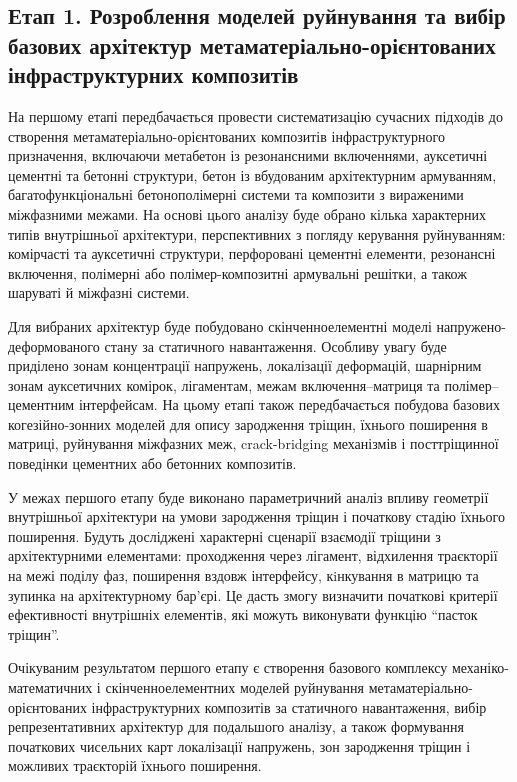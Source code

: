\documentclass[12pt,a4paper]{article}
\begin{document}
\subsection*{Етап 1. Розроблення моделей руйнування та вибір базових архітектур метаматеріально-орієнтованих інфраструктурних композитів}

На першому етапі передбачається провести систематизацію сучасних підходів до створення метаматеріально-орієнтованих композитів інфраструктурного призначення, включаючи метабетон із резонансними включеннями, ауксетичні цементні та бетонні структури, бетон із вбудованим архітектурним армуванням, багатофункціональні бетонополімерні системи та композити з вираженими міжфазними межами. На основі цього аналізу буде обрано кілька характерних типів внутрішньої архітектури, перспективних з погляду керування руйнуванням: комірчасті та ауксетичні структури, перфоровані цементні елементи, резонансні включення, полімерні або полімер-композитні армувальні решітки, а також шаруваті й міжфазні системи.

Для вибраних архітектур буде побудовано скінченноелементні моделі напружено-деформованого стану за статичного навантаження. Особливу увагу буде приділено зонам концентрації напружень, локалізації деформацій, шарнірним зонам ауксетичних комірок, лігаментам, межам включення--матриця та полімер--цементним інтерфейсам. На цьому етапі також передбачається побудова базових когезійно-зонних моделей для опису зародження тріщин, їхнього поширення в матриці, руйнування міжфазних меж, crack-bridging механізмів і посттріщинної поведінки цементних або бетонних композитів.

У межах першого етапу буде виконано параметричний аналіз впливу геометрії внутрішньої архітектури на умови зародження тріщин і початкову стадію їхнього поширення. Будуть досліджені характерні сценарії взаємодії тріщини з архітектурними елементами: проходження через лігамент, відхилення траєкторії на межі поділу фаз, поширення вздовж інтерфейсу, кiнкування в матрицю та зупинка на архітектурному бар'єрі. Це дасть змогу визначити початкові критерії ефективності внутрішніх елементів, які можуть виконувати функцію ``пасток тріщин''.

Очікуваним результатом першого етапу є створення базового комплексу механіко-математичних і скінченноелементних моделей руйнування метаматеріально-орієнтованих інфраструктурних композитів за статичного навантаження, вибір репрезентативних архітектур для подальшого аналізу, а також формування початкових чисельних карт локалізації напружень, зон зародження тріщин і можливих траєкторій їхнього поширення.
\end{document}
